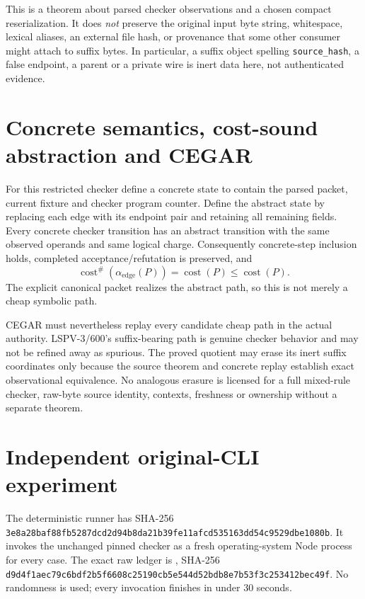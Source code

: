 \documentclass[11pt]{article}
\newcommand{\Aedge}{\alpha_{\mathrm{edge}}}
\begin{document}
This is a theorem about parsed checker observations and a chosen compact reserialization.  It does
\emph{not} preserve the original input byte string, whitespace, lexical aliases, an external file hash,
or provenance that some other consumer might attach to suffix bytes.  In particular, a suffix object
spelling \texttt{source\_hash}, a false endpoint, a parent or a private wire is inert data here, not
authenticated evidence.

\section*{Concrete semantics, cost-sound abstraction and CEGAR}

For this restricted checker define a concrete state to contain the parsed packet, current fixture and
checker program counter.  Define the abstract state by replacing each edge with its endpoint pair and
retaining all remaining fields.  Every concrete checker transition has an abstract transition with the
same observed operands and same logical charge.  Consequently concrete-step inclusion holds,
completed acceptance/refutation is preserved, and
\[
       \operatorname{cost}^{\#}(\Aedge(P))
       =\operatorname{cost}(P)
       \leq\operatorname{cost}(P).
\]
The explicit canonical packet realizes the abstract path, so this is not merely a cheap symbolic path.

CEGAR must nevertheless replay every candidate cheap path in the actual authority.  LSPV-3/600's
suffix-bearing path is genuine checker behavior and may not be refined away as spurious.  The proved
quotient may erase its inert suffix coordinates only because the source theorem and concrete replay
establish exact observational equivalence.  No analogous erasure is licensed for a full mixed-rule
checker, raw-byte source identity, contexts, freshness or ownership without a separate theorem.

\section*{Independent original-CLI experiment}

The deterministic runner
 has SHA-256
\texttt{3e8a28baf88fb5287dcd2d94b8da21b39fe11afcd535163dd54c9529dbe1080b}.
It invokes the unchanged pinned checker as a fresh operating-system Node process for every case.
The exact raw ledger is
,
SHA-256 \texttt{d9d4f1aec79c6bdf2b5f6608c25190cb5e544d52bdb8e7b53f3c253412bec49f}.
No randomness is used; every invocation finishes in under 30 seconds.
\end{document}
